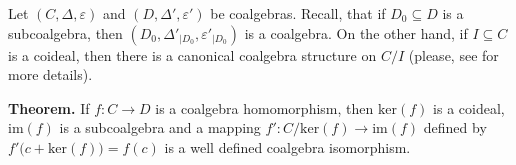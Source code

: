 \documentclass[12pt]{article}
\begin{document}
Let $(C,\Delta,\varepsilon)$ and $(D,\Delta',\varepsilon')$ be coalgebras. Recall, that if $D_0\subseteq D$ is a subcoalgebra, then $(D_0,\Delta'_{| D_0},\varepsilon'_{| D_0})$ is a coalgebra. On the other hand, if $I\subseteq C$ is a coideal, then there is a canonical coalgebra structure on $C/I$ (please, see  for more details).

\textbf{Theorem.} If $f:C\to D$ is a coalgebra homomorphism, then $\mathrm{ker}(f)$ is a coideal, $\mathrm{im}(f)$ is a subcoalgebra and a mapping $f':C/\mathrm{ker}(f)\to\mathrm{im}(f)$ defined by $f'\big( c+\mathrm{ker}(f)\big) =f(c)$ is a well defined coalgebra isomorphism.
\end{document}
